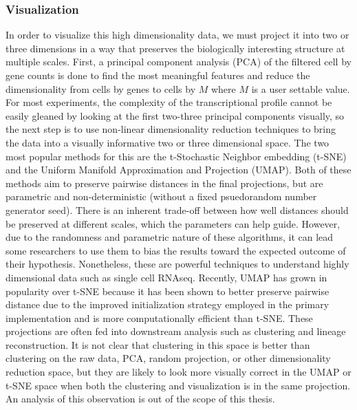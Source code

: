 \subsubsection{Visualization}

\par{
In order to visualize this high dimensionality data, we must project it into two or three dimensions in a way that preserves the biologically interesting structure at multiple scales. First, a principal component analysis (PCA) of the filtered cell by gene counts is done to find the most meaningful features and reduce the dimensionality from cells by genes to cells by $M$ where $M$ is a user settable value\cite{pcaimpl}. For most experiments, the complexity of the transcriptional profile cannot be easily gleaned by looking at the first two-three principal components visually, so the next step is to use non-linear dimensionality reduction techniques to bring the data into a visually informative two or three dimensional space. The two most popular methods for this are the t-Stochastic Neighbor embedding (t-SNE)\cite{tsne1}\cite{tsne2}\cite{hinton} and the Uniform Manifold Approximation and Projection (UMAP)\cite{umap1}. Both of these methods aim to preserve pairwise distances in the final projections, but are parametric and non-deterministic (without a fixed psuedorandom number generator seed). There is an inherent trade-off between how well distances should be preserved at different scales, which the parameters can help guide. However, due to the randomness and parametric nature of these algorithms, it can lead some researchers to use them to bias the results toward the expected outcome of their hypothesis. Nonetheless, these are powerful techniques to understand highly dimensional data such as single cell RNAseq. Recently, UMAP has grown in popularity over t-SNE because it has been shown to better preserve pairwise distance due to the improved initialization strategy employed in the primary implementation and is more computationally efficient than t-SNE\cite{umap2}\cite{umap3}. These projections are often fed into downstream analysis such as clustering and lineage reconstruction. It is not clear that clustering in this space is better than clustering on the raw data, PCA, random projection\cite{randomproject}, or other dimensionality reduction space, but they are likely to look more visually correct in the UMAP or t-SNE space when both the clustering and visualization is in the same projection. An analysis of this observation is out of the scope of this thesis.
}


